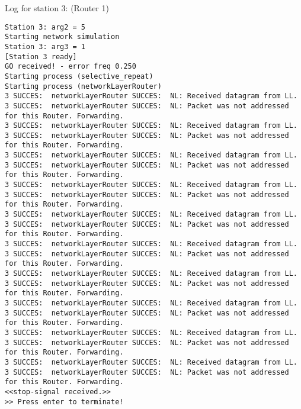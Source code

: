 Log for station 3: (Router 1)
\begin{lstlisting}[breaklines=true]
Station 3: arg2 = 5
Starting network simulation
Station 3: arg3 = 1
[Station 3 ready]
GO received! - error freq 0.250
Starting process (selective_repeat)
Starting process (networkLayerRouter)
3 SUCCES:  networkLayerRouter SUCCES:  NL: Received datagram from LL.
3 SUCCES:  networkLayerRouter SUCCES:  NL: Packet was not addressed for this Router. Forwarding.
3 SUCCES:  networkLayerRouter SUCCES:  NL: Received datagram from LL.
3 SUCCES:  networkLayerRouter SUCCES:  NL: Packet was not addressed for this Router. Forwarding.
3 SUCCES:  networkLayerRouter SUCCES:  NL: Received datagram from LL.
3 SUCCES:  networkLayerRouter SUCCES:  NL: Packet was not addressed for this Router. Forwarding.
3 SUCCES:  networkLayerRouter SUCCES:  NL: Received datagram from LL.
3 SUCCES:  networkLayerRouter SUCCES:  NL: Packet was not addressed for this Router. Forwarding.
3 SUCCES:  networkLayerRouter SUCCES:  NL: Received datagram from LL.
3 SUCCES:  networkLayerRouter SUCCES:  NL: Packet was not addressed for this Router. Forwarding.
3 SUCCES:  networkLayerRouter SUCCES:  NL: Received datagram from LL.
3 SUCCES:  networkLayerRouter SUCCES:  NL: Packet was not addressed for this Router. Forwarding.
3 SUCCES:  networkLayerRouter SUCCES:  NL: Received datagram from LL.
3 SUCCES:  networkLayerRouter SUCCES:  NL: Packet was not addressed for this Router. Forwarding.
3 SUCCES:  networkLayerRouter SUCCES:  NL: Received datagram from LL.
3 SUCCES:  networkLayerRouter SUCCES:  NL: Packet was not addressed for this Router. Forwarding.
3 SUCCES:  networkLayerRouter SUCCES:  NL: Received datagram from LL.
3 SUCCES:  networkLayerRouter SUCCES:  NL: Packet was not addressed for this Router. Forwarding.
3 SUCCES:  networkLayerRouter SUCCES:  NL: Received datagram from LL.
3 SUCCES:  networkLayerRouter SUCCES:  NL: Packet was not addressed for this Router. Forwarding.
<<stop-signal received.>>
>> Press enter to terminate!
\end{lstlisting}

